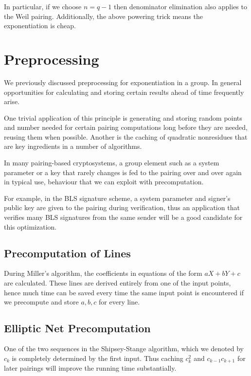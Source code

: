 In particular, if we choose $n = q - 1$ then denominator elimination
also applies to the Weil pairing. Additionally, the above powering trick
means the exponentiation is cheap.

\section {Preprocessing}

We previously discussed preprocessing for exponentiation in a group.
In general opportunities for calculating and storing
certain results ahead of time frequently arise.

One trivial application of this principle
is generating and storing random points and number needed for certain pairing
computations long before they are needed, reusing them when possible.
Another is the caching of quadratic nonresidues that are key
ingredients in a number of algorithms.

In many pairing-based cryptosystems, a group element such as a system parameter
or a key that rarely changes is fed to the pairing over and over again in
typical use, behaviour that we can exploit with precomputation.

For example, in the BLS signature scheme, a system parameter and
signer's public key are given to the pairing during verification, thus
an application that verifies many BLS signatures from the same sender will be a
good candidate for this optimization.

\subsection {Precomputation of Lines}

During Miller's algorithm, the coefficients in equations of the form
$aX + bY + c$ are calculated. These lines
are derived entirely from one of the input points,
hence much time can be saved every time the same input point is encountered
if we precompute and store $a, b, c$ for every line.

\subsection {Elliptic Net Precomputation}

One of the two sequences in the Shipsey-Stange algorithm, which
we denoted by $c_k$ is completely determined by the first input.
Thus caching $c_k^2$ and $c_{k-1}c_{k+1}$ for later pairings
will improve the running time substantially.

